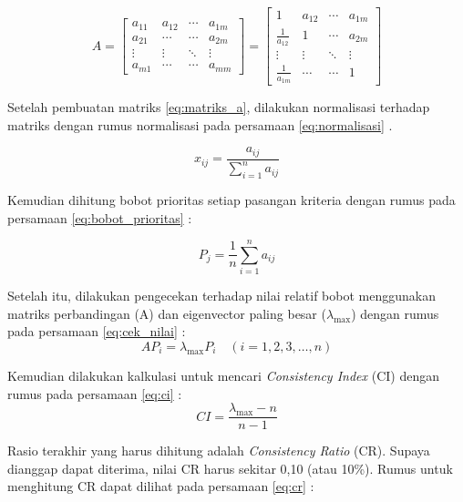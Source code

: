 \documentclass[journal,article,submit,pdftex,moreauthors]{Definitions/mdpi}
\begin{document}
\begin{equation}
A = \begin{bmatrix}
a_{11} & a_{12} & \cdots & a_{1m} \\
a_{21} & \cdots & \cdots & a_{2m} \\
\vdots & \vdots & \ddots & \vdots \\
a_{m1} & \cdots & \cdots & a_{mm}
\end{bmatrix} = 
\begin{bmatrix}
1 & a_{12} & \cdots & a_{1m} \\
\frac{1}{a_{12}} & 1 & \cdots & a_{2m} \\
\vdots & \vdots & \ddots & \vdots \\
\frac{1}{a_{1m}} & \cdots & \cdots & 1
\end{bmatrix}
\label{eq:matriks_a}
\end{equation}

Setelah pembuatan matriks \ref{eq:matriks_a}, dilakukan normalisasi terhadap matriks dengan rumus normalisasi pada persamaan \ref{eq:normalisasi} \cite{Singh2019}.

\begin{equation}
x_{ij} = \frac{a_{ij}}{\sum_{i=1}^{n} a_{ij}}
\label{eq:normalisasi}
\end{equation}

Kemudian dihitung bobot prioritas setiap pasangan kriteria dengan rumus pada persamaan \ref{eq:bobot_prioritas} \cite{Singh2019}:

\begin{equation}
P_j = \frac{1}{n} \sum_{i=1}^{n} a_{ij}
\label{eq:bobot_prioritas}
\end{equation}

Setelah itu, dilakukan pengecekan terhadap nilai relatif bobot menggunakan matriks perbandingan (A) dan eigenvector paling besar ($λ_{\text{max}}$) dengan rumus pada persamaan \ref{eq:cek_nilai} \cite{Singh2019}:
\begin{equation}
AP_i = \lambda_{\text{max}} P_i \quad (i = 1, 2, 3, \ldots, n)
\label{eq:cek_nilai}
\end{equation}

Kemudian dilakukan kalkulasi untuk mencari \textit{Consistency Index} (CI) dengan rumus pada persamaan \ref{eq:ci} \cite{Singh2019}:
\begin{equation}
CI = \frac{\lambda_{\text{max}} - n}{n - 1}
\label{eq:ci}
\end{equation}

Rasio terakhir yang harus dihitung adalah \textit{Consistency Ratio} (CR). Supaya dianggap dapat diterima, nilai CR harus sekitar 0,10 (atau 10\%). Rumus untuk menghitung CR dapat dilihat pada persamaan \ref{eq:cr} \cite{Singh2019}:
\end{document}

